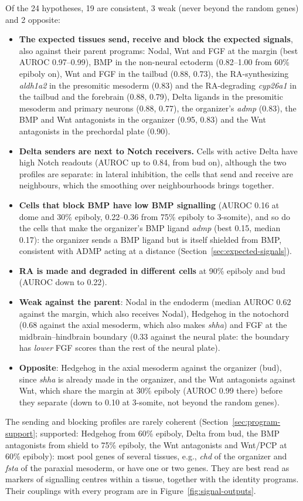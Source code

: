 \documentclass[11pt,a4paper]{article}
\begin{document}
Of the 24 hypotheses, 19 are consistent, 3 weak (never beyond the random genes) and 2 opposite:
\begin{itemize}
	\item \textbf{The expected tissues send, receive and block the expected signals}, also against their parent programs: Nodal, Wnt and FGF at the margin (best AUROC 0.97--0.99), BMP in the non-neural ectoderm (0.82--1.00 from 60\% epiboly on), Wnt and FGF in the tailbud (0.88, 0.73), the RA-synthesizing \emph{aldh1a2} in the presomitic mesoderm (0.83) and the RA-degrading \emph{cyp26a1} in the tailbud and the forebrain (0.88, 0.79), Delta ligands in the presomitic mesoderm and primary neurons (0.88, 0.77), the organizer's \emph{admp} (0.83), the BMP and Wnt antagonists in the organizer (0.95, 0.83) and the Wnt antagonists in the prechordal plate (0.90).
	\item \textbf{Delta senders are next to Notch receivers.} Cells with active Delta have high Notch readouts (AUROC up to 0.84, from bud on), although the two profiles are separate: in lateral inhibition, the cells that send and receive are neighbours, which the smoothing over neighbourhoods brings together.
	\item \textbf{Cells that block BMP have low BMP signalling} (AUROC 0.16 at dome and 30\% epiboly, 0.22--0.36 from 75\% epiboly to 3-somite), and so do the cells that make the organizer's BMP ligand \emph{admp} (best 0.15, median 0.17): the organizer sends a BMP ligand but is itself shielded from BMP, consistent with ADMP acting at a distance (Section~\ref{sec:expected-signals}).
	\item \textbf{RA is made and degraded in different cells} at 90\% epiboly and bud (AUROC down to 0.22).
	\item \textbf{Weak against the parent}: Nodal in the endoderm (median AUROC 0.62 against the margin, which also receives Nodal), Hedgehog in the notochord (0.68 against the axial mesoderm, which also makes \emph{shha}) and FGF at the midbrain--hindbrain boundary (0.33 against the neural plate: the boundary has \emph{lower} FGF scores than the rest of the neural plate).
	\item \textbf{Opposite}: Hedgehog in the axial mesoderm against the organizer (bud), since \emph{shha} is already made in the organizer, and the Wnt antagonists against Wnt, which share the margin at 30\% epiboly (AUROC 0.99 there) before they separate (down to 0.10 at 3-somite, not beyond the random genes).
\end{itemize}
The sending and blocking profiles are rarely coherent (Section~\ref{sec:program-support}; supported: Hedgehog from 60\% epiboly, Delta from bud, the BMP antagonists from shield to 75\% epiboly, the Wnt antagonists and Wnt/PCP at 60\% epiboly): most pool genes of several tissues, e.g., \emph{chd} of the organizer and \emph{fsta} of the paraxial mesoderm, or have one or two genes. They are best read as markers of signalling centres within a tissue, together with the identity programs. Their couplings with every program are in Figure~\ref{fig:signal-outputs}.
\end{document}

